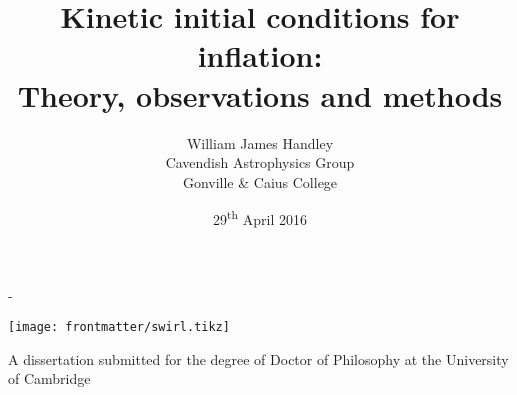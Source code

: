 \title{Kinetic initial conditions for inflation:\\ {\large Theory, observations and methods}}

\author{William James Handley\\
Cavendish Astrophysics Group \\
Gonville \& Caius College}
\date{29\textsuperscript{th} April 2016}

\calccentering{\unitlength}                         %
\begin{adjustwidth*}{\unitlength}{-\unitlength}     %

  \begin{titlingpage}
    \maketitle
    \begin{center}
      \texttt{[image: frontmatter/swirl.tikz]}

      A dissertation submitted for the degree of Doctor of Philosophy
      at the University of Cambridge 
    \end{center}

  \end{titlingpage}

\end{adjustwidth*}

